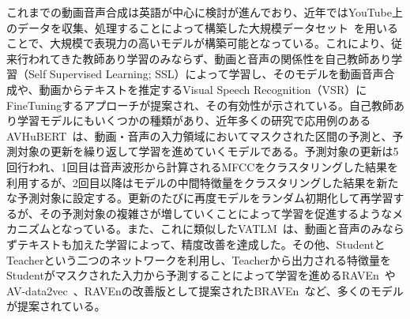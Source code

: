 \documentclass[12pt]{jarticle}
\numberwithin{equation}{section}    %
\numberwithin{figure}{section}      %
\numberwithin{table}{section}      %
\begin{document}
これまでの動画音声合成は英語が中心に検討が進んでおり、近年ではYouTube上のデータを収集、処理することによって構築した大規模データセット~\cite{afouras2018lrs3,chung2018voxceleb2}を用いることで、大規模で表現力の高いモデルが構築可能となっている。これにより、従来行われてきた教師あり学習のみならず、動画と音声の関係性を自己教師あり学習（Self Supervised Learning; SSL）によって学習し、そのモデルを動画音声合成や、動画からテキストを推定するVisual Speech Recognition（VSR）にFineTuningするアプローチが提案され、その有効性が示されている。自己教師あり学習モデルにもいくつかの種類があり、近年多くの研究で応用例のあるAVHuBERT~\cite{shi2022learning}は、動画・音声の入力領域においてマスクされた区間の予測と、予測対象の更新を繰り返して学習を進めていくモデルである。予測対象の更新は5回行われ、1回目は音声波形から計算されるMFCCをクラスタリングした結果を利用するが、2回目以降はモデルの中間特徴量をクラスタリングした結果を新たな予測対象に設定する。更新のたびに再度モデルをランダム初期化して再学習するが、その予測対象の複雑さが増していくことによって学習を促進するようなメカニズムとなっている。また、これに類似したVATLM~\cite{zhu2023vatlm}は、動画と音声のみならずテキストも加えた学習によって、精度改善を達成した。その他、StudentとTeacherという二つのネットワークを利用し、Teacherから出力される特徴量をStudentがマスクされた入力から予測することによって学習を進めるRAVEn~\cite{haliassos2022jointly}やAV-data2vec~\cite{lian2023av}、RAVEnの改善版として提案されたBRAVEn~\cite{haliassos2024braven}など、多くのモデルが提案されている。
\end{document}
